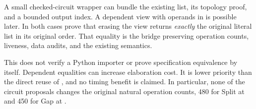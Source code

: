 A small checked-circuit wrapper can bundle the existing list, its topology
proof, and a bounded output index. A dependent  view with
operands in  is possible later. In both cases prove that
erasing the view returns \emph{exactly} the original literal list in its
original order. That equality is the bridge preserving operation counts,
liveness, data audits, and the existing semantics.

This does not verify a Python importer or prove specification equivalence
by itself. Dependent equalities can increase elaboration cost. It is lower
priority than the direct reuse of , and no timing benefit is
claimed. In particular, none of the circuit proposals changes the original
natural operation counts, 480 for Split at
 and 450 for Gap at
.
